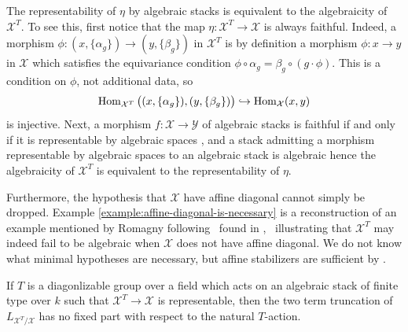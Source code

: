 \documentclass[12pt,dvipsnames]{amsart}
\begin{document}
\begin{remark}\label{rl-000E}\label{rmk:algebraicity-is-representability}
  The representability of \(\eta\) by algebraic stacks is equivalent to the algebraicity of \(\mathcal X^T\). To see this, first notice that the map \(\eta:\mathcal X^T\to \mathcal X\) is always faithful. Indeed, a morphism \(\phi:(x,\{\alpha_g\})\to (y,\{\beta_g\})\) in \(\mathcal X^T\) is by definition a morphism \(\phi:x\to y\) in \(\mathcal X\) which satisfies the equivariance condition \(\phi\circ \alpha_g = \beta_g \circ (g\cdot \phi)\). This is a condition on \(\phi\), not additional data, so
  \[\operatorname{Hom}_{\mathcal X^T}\big((x,\{\alpha_g\}), (y,\{\beta_g\})\big) \hookrightarrow \operatorname{Hom}_{\mathcal X}(x,y)\]
  is injective. Next, a morphism \(f:\mathcal X\to \mathcal Y\) of algebraic stacks is faithful if and only if it is representable by algebraic spaces \cite[\href{https://stacks.math.columbia.edu/tag/04Y5}{Tag 04Y5}]{stacks-project}, and a stack admitting a morphism representable by algebraic spaces to an algebraic stack is algebraic \cite[\href{https://stacks.math.columbia.edu/tag/03YS}{Tag 03YS}]{stacks-project} hence the algebraicity of \(\mathcal X^T\) is equivalent to the representability of \(\eta\).
\end{remark}

Furthermore, the hypothesis that \(\mathcal X\) have affine diagonal cannot simply be dropped. Example \ref{example:affine-diagonal-is-necessary} is a reconstruction of an example mentioned by Romagny following~\cite[Theorem 1.2.2]{romagny_AlgebraicitySmoothnessFixed2022} found in \cite[Exp. IX, Rem. 7.4]{SGA3-2},~ illustrating that \(\mathcal X^T\) may indeed fail to be algebraic when \(\mathcal X\) does not have affine diagonal. We do not know what minimal hypotheses are necessary, but affine stabilizers are sufficient by \cite[Theorem A.20]{aranha-khan-latyntsev-etal_VirtualLocalizationRevisited2025}.
\begin{lemma}\label{rl-000F}\label{lem:two-term-truncation-of-fixed-locus-cotangent-complex-no-fixed-part}
  If \(T\) is a diagonlizable group over a field which acts on an algebraic stack of finite type over \(k\) such that \(\mathcal X^T\to \mathcal X\) is representable, then the two term truncation of \(L_{\mathcal X^T/\mathcal X}\) has no fixed part with respect to the natural \(T\)-action.
\end{lemma}
\end{document}
